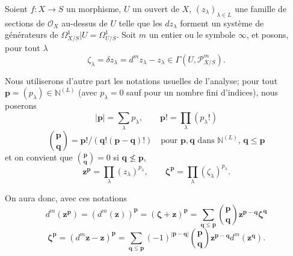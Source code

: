 \begin{env}[16.11.1]
\label{IV.16.11.1}
Soient $f:X\to S$ un morphisme, $U$ un ouvert de $X$,
$(z_\lambda)_{\lambda\in L}$ une famille de sections de $\mathcal{O}_X$
au-dessus de $U$ telle que les $dz_\lambda$ forment un système de générateurs
de $\Omega_{X/S}^1|U=\Omega_{U/S}^1$. Soit $m$ un entier ou le symbole
$\infty$, et posons, pour tout $\lambda$
\[
  \zeta_\lambda=\delta z_\lambda=d^m z_\lambda-z_\lambda
  \in\Gamma(U,\mathscr{P}_{X/S}^m).
  \tag{16.11.1.1}
  \label{IV.16.11.1.1}
\]

Nous utiliserons d'autre part les notations usuelles de l'analyse; pour tout
$\mathbf{p}=(p_\lambda)\in\mathbb{N}^{(L)}$ (avec $p_\lambda=0$ sauf pour un
nombre fini d'indices), nous poserons
\[
  |\mathbf{p}|=\sum_\lambda p_\lambda,
  \qquad \mathbf{p}!=\prod_\lambda(p_\lambda!)
  \tag{16.11.1.2}
  \label{IV.16.11.1.2}
\]
\[
  \binom{\mathbf{p}}{\mathbf{q}}
  =\mathbf{p}!/(\mathbf{q}!(\mathbf{p}-\mathbf{q})!)
  \quad\text{pour $\mathbf{p},\mathbf{q}$ dans $\mathbb{N}^{(L)}$,
  $\mathbf{q}\leq\mathbf{p}$}
  \tag{16.11.1.3}
  \label{IV.16.11.1.3}
\]
et on convient que $\binom{\mathbf{p}}{\mathbf{q}}=0$ si
$\mathbf{q}\nleq\mathbf{p}$,
\[
  \mathbf{z}^{\mathbf{p}}=\prod_\lambda(z_\lambda)^{p_\lambda},
  \qquad
  \boldsymbol{\zeta}^{\mathbf{p}}=\prod_\lambda(\zeta_\lambda)^{p_\lambda}.
  \tag{16.11.1.4}
  \label{IV.16.11.1.4}
\]

On aura donc, avec ces notations
\[
  d^m(\mathbf{z}^{\mathbf{p}})
  =(d^m(\mathbf{z}))^{\mathbf{p}}
  =(\boldsymbol{\zeta}+\mathbf{z})^{\mathbf{p}}
  =\sum_{\mathbf{q}\leq\mathbf{p}}
    \binom{\mathbf{p}}{\mathbf{q}}
    \mathbf{z}^{\mathbf{p}-\mathbf{q}}\boldsymbol{\zeta}^{\mathbf{q}}
  \tag{16.11.1.5}
  \label{IV.16.11.1.5}
\]
\[
  \boldsymbol{\zeta}^{\mathbf{p}}
  =(d^m\mathbf{z}-\mathbf{z})^{\mathbf{p}}
  =\sum_{\mathbf{q}\leq\mathbf{p}}
    (-1)^{|\mathbf{p}-\mathbf{q}|}
    \binom{\mathbf{p}}{\mathbf{q}}
    \mathbf{z}^{\mathbf{p}-\mathbf{q}}d^m(\mathbf{z}^{\mathbf{q}}).
  \tag{16.11.1.6}
  \label{IV.16.11.1.6}
\]


\end{env}

